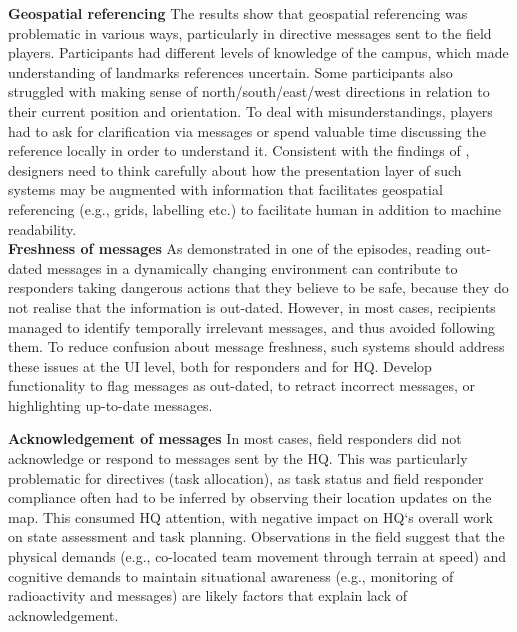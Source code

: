 \textbf{Geospatial referencing} The results show that geospatial referencing was problematic in various ways, particularly in directive messages sent to the field players. Participants had different levels of knowledge of the campus, which made understanding of landmarks references uncertain. Some participants also struggled with making sense of north/south/east/west directions in relation to their current position and orientation. To deal with misunderstandings, players had to ask for clarification via messages or spend valuable time discussing the reference locally in order to understand it. Consistent with the findings of \cite{Toups2009}, designers need to think carefully about how the presentation layer of such systems may be augmented with information that facilitates geospatial referencing (e.g., grids, labelling etc.) to facilitate human in addition to machine readability. \\


\textbf{Freshness of messages} As demonstrated in one of the episodes, reading out-dated messages in a dynamically changing environment can contribute to responders taking dangerous actions that they believe to be safe, because they do not realise that the information is out-dated. However, in most cases, recipients managed to identify temporally irrelevant messages, and thus avoided following them. To reduce confusion about message freshness, such systems should address these issues at the UI level, both for responders and for HQ. Develop functionality to flag messages as out-dated, to retract incorrect messages, or highlighting up-to-date messages. 



\textbf{Acknowledgement of messages} In most cases, field responders did not acknowledge or respond to messages sent by the HQ. This was particularly problematic for directives (task allocation), as task status and field responder compliance often had to be inferred by observing their location updates on the map. This consumed HQ attention, with negative impact on HQ`s overall work on state assessment and task planning. Observations in the field suggest that the physical demands (e.g., co-located team movement through terrain at speed) and cognitive demands to maintain situational awareness (e.g., monitoring of radioactivity and messages) are likely factors that explain lack of acknowledgement.\\


